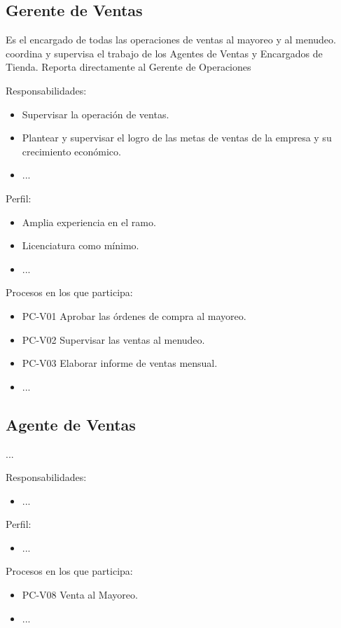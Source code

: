 \begin{Usuario}{\subsection{Gerente de Ventas}}{
		Es el encargado de todas las operaciones de ventas al mayoreo y al menudeo. coordina y supervisa el trabajo de los Agentes de Ventas y Encargados de Tienda.
		Reporta directamente al Gerente de Operaciones
	}
	\item[Responsabilidades:] \cdtEmpty
	\begin{itemize}
		\item Supervisar la operación de ventas.
		\item Plantear y supervisar el logro de las metas de ventas de la empresa y su crecimiento económico.
		\item ...
	\end{itemize}

	\item[Perfil:] \cdtEmpty
	\begin{itemize}
		\item Amplia experiencia en el ramo.
		\item Licenciatura como mínimo.
		\item ...
	\end{itemize}
	\item[Procesos en los que participa:] \cdtEmpty
	\begin{itemize}
		\item PC-V01 Aprobar las órdenes de compra al mayoreo.
		\item PC-V02 Supervisar las ventas al menudeo.
		\item PC-V03 Elaborar informe de ventas mensual.
		\item ...
	\end{itemize}
\end{Usuario}

\begin{Usuario}{\subsection{Agente de Ventas}}{
		...
	}
	\item[Responsabilidades:] \cdtEmpty
	\begin{itemize}
		\item ...
	\end{itemize}

	\item[Perfil:] \cdtEmpty
	\begin{itemize}
		\item ...
	\end{itemize}
	\item[Procesos en los que participa:] \cdtEmpty
	\begin{itemize}
		\item PC-V08 Venta al Mayoreo.
		\item ...
	\end{itemize}
\end{Usuario}


